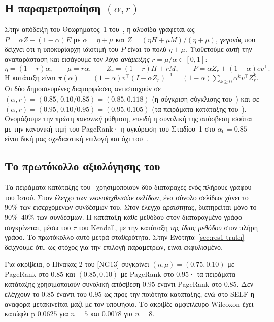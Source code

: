 \documentclass[11pt,a4paper]{article}
\theoremstyle{definition}
\theoremstyle{remark}
\begin{document}
\subsection{Η παραμετροποίηση \texorpdfstring{$(\alpha,r)$}{(α, r)}}
Στην απόδειξη του Θεωρήματος~1 του~\cite{ng13}, η αλυσίδα γράφεται ως $P=\alpha Z+(1-\alpha)E$ με
$\alpha=\eta+\mu$ και $Z=(\eta H+\mu M)/(\eta+\mu)$, γεγονός που δείχνει ότι η υποκυρίαρχη ιδιοτιμή
του $P$ είναι το πολύ $\eta+\mu$. Υιοθετούμε αυτή την αναπαράσταση και εισάγουμε τον \emph{λόγο
ανάμειξης} $r=\mu/\alpha\in[0,1]$:
\begin{equation}
\eta=(1-r)\alpha,\qquad \mu=r\alpha,\qquad Z_r=(1-r)H+rM,\qquad P=\alpha Z_r+(1-\alpha)ev^\top .
\label{eq:param}
\end{equation}
Η κατάταξη είναι $\pi(\alpha)^\top=(1-\alpha)v^\top(I-\alpha Z_r)^{-1}=(1-\alpha)\sum_{k\ge0}\alpha^k v^\top Z_r^k$.
Οι δύο δημοσιευμένες διαμορφώσεις αντιστοιχούν σε $(\alpha,r)=(0.85,\,0.10/0.85)=(0.85,0.118)$ (η
σύγκριση σύγκλισης του~\cite[Πίνακας~2]{ng13}) και σε $(\alpha,r)=(0.95,\,0.10/0.95)=(0.95,0.105)$
(τα πειράματα κατάταξης του~\cite[§4]{ng13}). Ονομάζουμε την πρώτη \emph{κανονική} ρύθμιση, επειδή η
συνολική της απόσβεση ισούται με την κανονική τιμή του PageRank· η αγκύρωση του Σταδίου~1 στο
$\alpha_0=0.85$ είναι δική μας σχεδιαστική επιλογή και όχι του~\cite{ng13}.

\subsection{Το πρωτόκολλο αξιολόγησης του~\texorpdfstring{\cite{ng13}}{[NG13]}}
Τα πειράματα κατάταξης του~\cite{ng13} χρησιμοποιούν δύο διαταραχές ενός πλήρους γράφου του Ιστού.
Στον έλεγχο των \emph{νεοεισαχθεισών σελίδων}, ένα σύνολο σελίδων χάνει το $90\%$ των εισερχόμενων
συνδέσμων του. Στον έλεγχο \emph{αραιότητας}, διατηρείται μόνο το $90\%$--$40\%$ των συνδέσμων. Η
κατάταξη κάθε μεθόδου στον διαταραγμένο γράφο συγκρίνεται, μέσω του $\tau$ του Kendall, με την
κατάταξη \emph{της ίδιας μεθόδου} στον πλήρη γράφο. Το πρωτόκολλο αυτό μετρά σταθερότητα. Στην
Ενότητα~\ref{sec:res1-truth} δείχνουμε ότι, ως στόχος για την επιλογή παραμέτρων, είναι εκφυλισμένο.

Για ακρίβεια, ο Πίνακας 2 του [NG13] συγκρίνει $(\eta,\mu)=(0.75,0.10)$ με PageRank στο $0.85$
και $(0.85,0.10)$ με PageRank στο $0.95$· τα πειράματα κατάταξης χρησιμοποιούν συνολική απόσβεση
$0.95$ έναντι PageRank στο $0.85$. Δεν ελέγχουν το $0.85$ έναντι του $0.95$ ως προς την ποιότητα
κατάταξης, ενώ στο SELF η αναφορά μετακινείται μαζί με τον υποψήφιο. Το ακριβές αμφίπλευρο Wilcoxon
έχει κατώφλι p $0.0625$ για $n=5$ και $0.0078$ για $n=8$.
\end{document}

